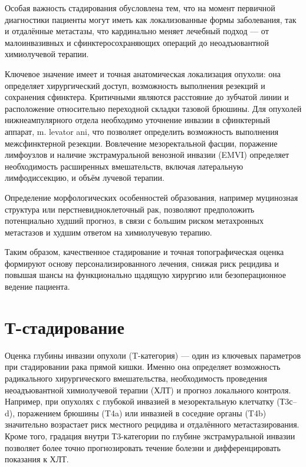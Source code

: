 \documentclass[
  russian,
  12pt,
  a4paper,
]{report}
\begin{document}
Особая важность стадирования обусловлена тем, что на момент первичной
диагностики пациенты могут иметь как локализованные формы заболевания,
так и отдалённые метастазы, что кардинально меняет лечебный подход ---
от малоинвазивных и сфинктеросохраняющих операций до неоадъювантной
химиолучевой терапии.

Ключевое значение имеет и точная анатомическая локализация опухоли: она
определяет хирургический доступ, возможность выполнения резекций и
сохранения сфинктера. Критичными являются расстояние до зубчатой линии и
расположение относительно переходной складки тазовой брюшины. Для
опухолей нижнеампулярного отдела необходимо уточнение инвазии в
сфинктерный аппарат, m. levator ani, что позволяет определить
возможность выполнения межсфинктерной резекции. Вовлечение
мезоректальной фасции, поражение лимфоузлов и наличие экстрамуральной
венозной инвазии (EMVI) определяет необходимость расширенных
вмешательств, включая латеральную лимфодиссекцию, и объём лучевой
терапии.

Определение морфологических особенностей образования, например
муцинозная структура или перстневидноклеточный рак, позволяют
предположить потенциально худший прогноз, в связи с большим риском
метахронных метастазов и худшим ответом на химиолучевую терапию.

Таким образом, качественное стадирование и точная топографическая оценка
формируют основу персонализированного лечения, снижая риск рецидива и
повышая шансы на функционально щадящую хирургию или безоперационное
ведение пациента.

\chapter{Т-стадирование}\label{ux442-ux441ux442ux430ux434ux438ux440ux43eux432ux430ux43dux438ux435}

Оценка глубины инвазии опухоли (T-категория) --- один из ключевых
параметров при стадировании рака прямой кишки. Именно она определяет
возможность радикального хирургического вмешательства, необходимость
проведения неоадъювантной химиолучевой терапии (ХЛТ) и прогноз
локального контроля. Например, при опухолях с глубокой инвазией в
мезоректальную клетчатку (Т3с--d), поражением брюшины (T4a) или инвазией
в соседние органы (T4b) значительно возрастает риск местного рецидива и
отдалённого метастазирования. Кроме того, градация внутри Т3-категории
по глубине экстрамуральной инвазии позволяет более точно прогнозировать
течение болезни и дифференцировать показания к ХЛТ.
\end{document}
